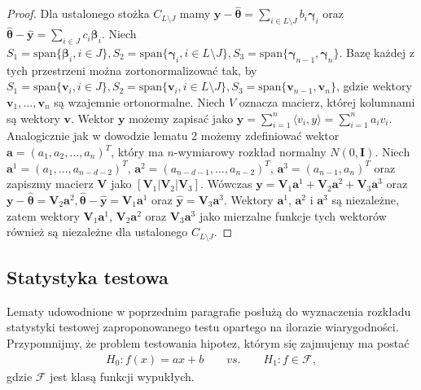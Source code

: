 \documentclass[12pt]{mwart}
\begin{document}
\begin{proof}
Dla ustalonego stożka $C_{L\setminus J}$ mamy $\pmb{y}-\hat{\pmb{\theta}}= \sum_{i\in L\setminus J}{b_i\pmb{\gamma}_i}$ oraz  $\hat{\pmb{\theta}}-\hat{\pmb{y}}=\sum_{i\in J}{c_i\pmb{\beta}_i}$. Niech $S_1=\textrm{span}\{\pmb{\beta}_i,i\in J\},S_2=\textrm{span}\{\pmb{\gamma}_i,i\in L\setminus J\},S_3=\textrm{span}\{\pmb{\gamma}_{n-1},\pmb{\gamma}_n\}$. Bazę każdej z tych przestrzeni można zortonormalizować tak, by $S_1=\textrm{span}\{\pmb{v}_i,i\in J\},S_2=\textrm{span}\{\pmb{v}_i,i\in L\setminus J\},S_3=\textrm{span}\{\pmb{v}_{n-1},\pmb{v}_n\}$, gdzie wektory $\pmb{v}_1,\dots ,\pmb{v}_n$ są wzajemnie ortonormalne. Niech $V$ oznacza macierz, której kolumnami są wektory $\pmb{v}$. Wektor $\pmb{y}$ możemy zapisać jako $\pmb{y}=\sum_{i=1}^n{\langle v_i, y\rangle}=\sum_{i=1}^n{a_iv_i}$. Analogicznie jak w dowodzie lematu 2 możemy zdefiniować wektor $\pmb{a}=(a_1,a_2,\dots,a_n)^T$, który ma $n$-wymiarowy rozkład normalny $N(0,\pmb{I})$. Niech $\pmb{a}^1=(a_1,\dots,a_{n-d-2})^T$, $\pmb{a}^2=(a_{n-d-1},\dots,a_{n-2})^T$, $\pmb{a}^3=(a_{n-1},a_n)^T$ oraz zapiszmy macierz $\pmb{V}$ jako $[\pmb{V}_1|\pmb{V}_2|\pmb{V}_3]$. Wówczas $\pmb{y}=\pmb{V}_1\pmb{a}^1+\pmb{V}_2\pmb{a}^2+\pmb{V}_3\pmb{a}^3$ oraz $\pmb{y}-\hat{\pmb{\theta}}=\pmb{V}_2\pmb{a}^2, \hat{\pmb{\theta}}-\hat{\pmb{y}}=\pmb{V}_1\pmb{a}^1$ oraz $\hat{\pmb{y}}=\pmb{V}_3\pmb{a}^3$. Wektory $\pmb{a}^1$, $\pmb{a}^2$ i $\pmb{a}^3$ są niezależne, zatem wektory $\pmb{V}_1\pmb{a}^1$, $\pmb{V}_2\pmb{a}^2$ oraz $\pmb{V}_3\pmb{a}^3$ jako mierzalne funkcje tych wektorów również są niezależne dla ustalonego $C_{L\setminus J}$.
\end{proof}

\subsection{Statystyka testowa}
Lematy udowodnione w poprzednim paragrafie posłużą do wyznaczenia rozkładu statystyki testowej zaproponowanego testu opartego na ilorazie wiarygodności. Przypomnijmy, że problem testowania hipotez, którym się zajmujemy ma postać
\begin{eqnarray}\label{problem}
H_0\colon f(x)=ax+b \qquad vs.\qquad H_1\colon f\in \mathcal{F},
\end{eqnarray}
gdzie $\mathcal{F}$ jest klasą funkcji wypukłych.
\end{document}
